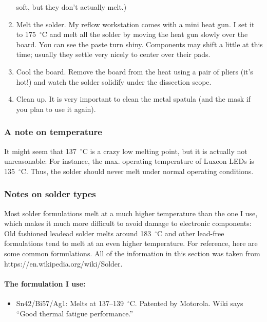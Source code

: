 \documentclass[11pt]{report}
\def\degC{$^\circ$C}
\begin{document}
\begin{enumerate}
    soft, but they don't actually melt.)
  \item Melt the solder. My reflow workstation comes with a mini
    heat gun. I set it to 175~\degC{} and melt all the solder by
    moving the heat gun slowly over the board. You can see the paste
    turn shiny. Components may shift a little at this time; usually
    they settle very nicely to center over their pads.
  \item Cool the board. Remove the board from the heat using a pair
    of pliers (it’s hot!) and watch the solder solidify under the
    dissection scope.
  \item Clean up. It is very important to clean the metal spatula
    (and the mask if you plan to use it again).
\end{enumerate}

\subsubsection{A note on temperature}

It might seem that 137~\degC{} is a crazy low melting point, but it is
actually not unreasonable: For instance, the max. operating
temperature of Luxeon LEDs is 135~\degC{}. Thus, the solder should never melt under normal operating conditions.

\subsubsection{Notes on solder types}

Most solder formulations melt at a much higher temperature than the
one I use, which makes it much more difficult to avoid damage to
electronic components: Old fashioned leadead solder melts around
183~\degC{} and other lead-free formulations tend to melt at an even
higher temperature. For reference, here are some common
formulations. All of the information in this section was taken from
https://en.wikipedia.org/wiki/Solder.

\paragraph{The formulation I use:}
\begin{itemize}\item Sn42/Bi57/Ag1: Melts at 137--139~\degC{}. Patented by
  Motorola. Wiki says ``Good thermal fatigue performance.''
\end{itemize}
\end{document}
